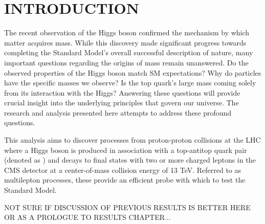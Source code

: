 %
%

\chapter{INTRODUCTION}
The recent observation of the Higgs boson confirmed the mechanism by which matter acquires mass. While this discovery made
significant progress towards completing the Standard Model's overall successful description of nature, many important questions
regarding the origins of mass remain unanswered. Do the observed properties of the Higgs boson match SM expectations? Why do
particles have the specific masses we observe? Is the top quark's large mass coming solely from its interaction with the Higgs?
Answering these questions will provide crucial insight into the underlying principles that govern our universe. The research and
analysis presented here attempts to address these profound questions. 

This analysis aims to discover processes from proton-proton collisions at the LHC where a Higgs boson is produced in association
with a top-antitop quark pair (denoted as \tth) and decays to final states with two or more charged leptons in the CMS detector
at a center-of-mass collision energy of 13 TeV.
Referred to as \tth multilepton processes, these provide an efficient probe with which to test the Standard Model. 

NOT SURE IF DISCUSSION OF PREVIOUS \tth RESULTS IS BETTER HERE OR AS A PROLOGUE TO RESULTS CHAPTER...

%
% 
% 
